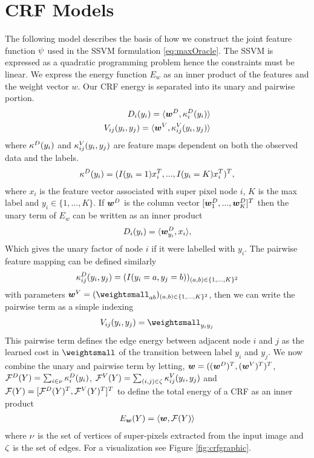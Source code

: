 \section{CRF Models}
The following model describes the basis of how we construct the joint feature function $\psi$ used in the SSVM formulation \ref{eq:maxOracle}. The SSVM is expressed as a quadratic programming problem hence the constraints must be linear. We express the energy function $E_w$ as an inner product of the features and the weight vector $w$. Our CRF energy is separated into its unary and pairwise portion. 
\begin{align}
D_i(y_i) = \langle \bm{w}^D, \kappa^D_i(y_i) \rangle \\
V_{ij}(y_i,y_j) = \langle \bm{w}^V, \kappa^V_{i j}(y_i,y_j) \rangle
\end{align}
where $\kappa^D(y_i)$ and $\kappa^V_{i j}(y_i,y_j)$ are feature maps dependent on both the observed data and the labels. 
\begin{align}
\kappa^D(y_i) = (I(y_i= 1 )x_i^T, ..., I(y_i = K)x_i^T)^T, 
\end{align}
where $x_i$ is the feature vector associated with super pixel node $i$,  $K$ is the max label and $y_i \in \{ 1,...,K \}$. If $\bm{w}^D$ is the column vector $[\bm{w}^D_1,...,\bm{w}^D_K]^T$ then the unary term of $E_w$ can be written as an inner product 
\begin{align}
D_i(y_i) = \langle \bm{w}^D_{y_i},x_i\rangle,
\end{align}
Which gives the unary factor of node $i$ if it were labelled with $y_i$. The pairwise feature mapping can be defined similarly 
\begin{align}
  \kappa_{i j}^D(y_i,y_j) = (I(y_i = a, y_j = b))_{(a,b) \in \{ 1,...,K\}^2}
  \end{align}
    with parameters $\weightVec^V = (\weightsmall_{a b})_{(a,b) \in \{ 1,..., K\}^2 }$, then we can write the pairwise term as a simple indexing 
  \begin{align}
V_{i j} (y_i, y_j) = \weightsmall_{y_i y_j}
\end{align}
  This pairwise term defines the edge energy between adjacent node $i$ and $j$ as the learned cost in $\weightsmall$ of the transition between label $y_i$ and $y_j$. We now combine the unary and pairwise term by letting, $\bm{w} = ((\bm{w}^D)^T, (\bm{w}^V)^T)^T$, $\mathcal{F}^D(Y) = \sum_{i \in \nu} \kappa^D_i(y_i)$, $\mathcal{F}^V(Y) = \sum_{(i,j) \in \zeta} \kappa^V_{i j} (y_i, y_j)$ and  $\mathcal{F}(Y) = [ \mathcal{F}^D(Y)^T, \mathcal{F}^V(Y)^T ]^T$ to define the total energy of a CRF as an inner product 
\begin{align}\label{eq:crfenergy}
E_{\bm{w}} (Y) = \langle \bm{w}, \mathcal{F}(Y) \rangle 
\end{align}
  where $\nu$ is the set of vertices of super-pixels extracted from the input image and  $\zeta$ is the set of edges. For a visualization see Figure \ref{fig:crfgraphic}. 
